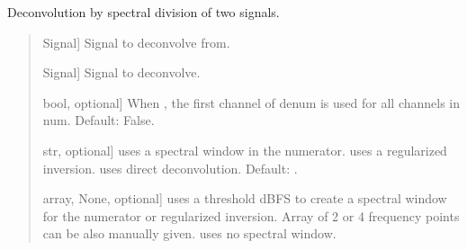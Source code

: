\documentclass[letterpaper,10pt,english]{sphinxmanual}
\begin{document}
\begin{fulllineitems}
\label{\detokenize{modules/dsptools.transfer_functions:dsptools.transfer_functions.spectral_deconvolve}}
\pysigstartsignatures
{}
\pysigstopsignatures
\sphinxAtStartPar
Deconvolution by spectral division of two signals.
\begin{quote}\begin{description}
\begin{description}
\sphinxlineitem{\sphinxstylestrong{num}}{[}Signal{]}
\sphinxAtStartPar
Signal to deconvolve from.

\sphinxlineitem{\sphinxstylestrong{denum}}{[}Signal{]}
\sphinxAtStartPar
Signal to deconvolve.

\sphinxlineitem{\sphinxstylestrong{multichannel}}{[}bool, optional{]}
\sphinxAtStartPar
When , the first channel of denum is used for all channels
in num. Default: False.

\sphinxlineitem{\sphinxstylestrong{mode}}{[}str, optional{]}
\sphinxAtStartPar
{} uses a spectral window in the numerator. 
uses a regularized inversion.  uses direct deconvolution.
Default: .

\sphinxlineitem{\sphinxstylestrong{start\_stop\_hz}}{[}array, None, optional{]}
\sphinxAtStartPar
{} uses a threshold dBFS to create a spectral
window for the numerator or regularized inversion. Array of 2 or
4 frequency points can be also manually given.  uses no
spectral window.


\end{description}
\end{description}
\end{quote}
\end{fulllineitems}
\end{document}
